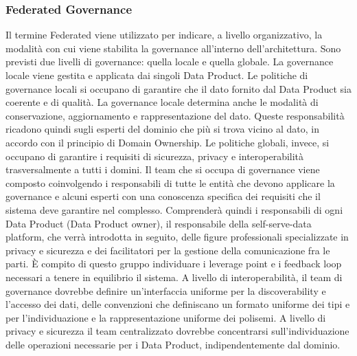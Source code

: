 \documentclass[a4paper,12pt]{report}
\begin{document}
\subsubsection{Federated Governance}
Il termine Federated viene utilizzato per indicare, a livello organizzativo, la modalità con cui viene stabilita la governance all'interno dell'architettura.
Sono previsti due livelli di governance: quella locale e quella globale.
La governance locale viene gestita e applicata dai singoli Data Product.
Le politiche di governance locali si occupano di garantire che il dato fornito dal Data Product sia coerente e di qualità. 
La governance locale determina anche le modalità di conservazione, aggiornamento e rappresentazione del dato.
Queste responsabilità ricadono quindi sugli esperti del dominio che più si trova vicino al dato, in accordo con il principio di Domain Ownership.
Le politiche globali, invece, si occupano di garantire i requisiti di sicurezza, privacy e interoperabilità trasversalmente a tutti i domini. 
Il team che si occupa di governance viene composto coinvolgendo i responsabili di tutte le entità che devono applicare la governance e alcuni esperti con una conoscenza specifica dei requisiti che il sistema deve garantire nel complesso. 
Comprenderà quindi i responsabili di ogni Data Product (Data Product owner), il responsabile della self-serve-data platform, che verrà introdotta in seguito, delle figure professionali specializzate in privacy e sicurezza e dei facilitatori per la gestione della comunicazione fra le parti.
È compito di questo gruppo individuare i leverage point e i feedback loop necessari a tenere in equilibrio il sistema. 
A livello di interoperabilità, il team di governance dovrebbe definire un'interfaccia uniforme per la discoverability e l'accesso dei dati, delle convenzioni che definiscano un formato uniforme dei tipi e per l'individuazione e la rappresentazione uniforme dei polisemi.
A livello di privacy e sicurezza il team centralizzato dovrebbe concentrarsi sull'individuazione delle operazioni necessarie per i Data Product, indipendentemente dal dominio.
\end{document}
